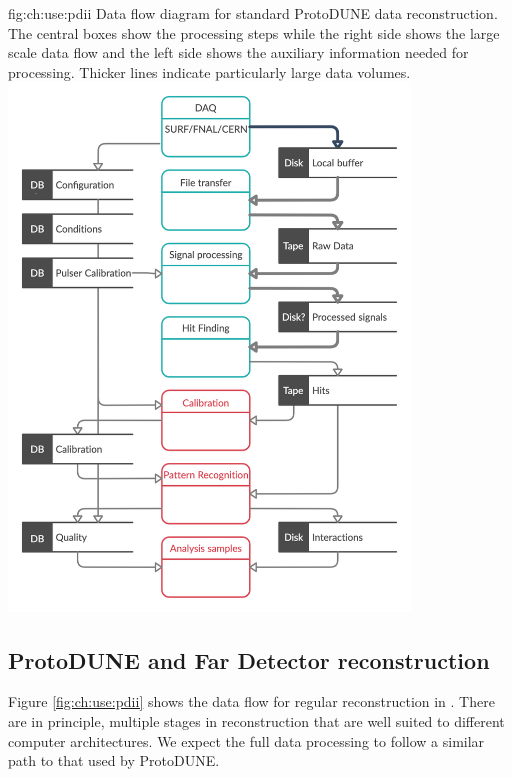 \documentclass[../main-v1.tex]{subfiles}
\begin{document}
\begin{dunefigure}
{fig:ch:use:pdii}
{Data flow diagram for standard ProtoDUNE data reconstruction. The central boxes show the processing steps while the right side shows the large scale data flow  and the left side shows the auxiliary information needed for processing. Thicker lines indicate particularly large data volumes.}
\includegraphics[width=0.8\textwidth]{graphics/IntroFigures/Data_processing_FD_v3.png}
\end{dunefigure}

\subsection{ProtoDUNE and Far Detector reconstruction}\label{sec:use:pdii}

Figure \ref{fig:ch:use:pdii} shows the data flow for regular reconstruction in .  There are in principle, multiple stages in reconstruction that are well suited to different computer architectures.  We expect the full  data processing to follow a similar path to that used by ProtoDUNE.  
\end{document}
